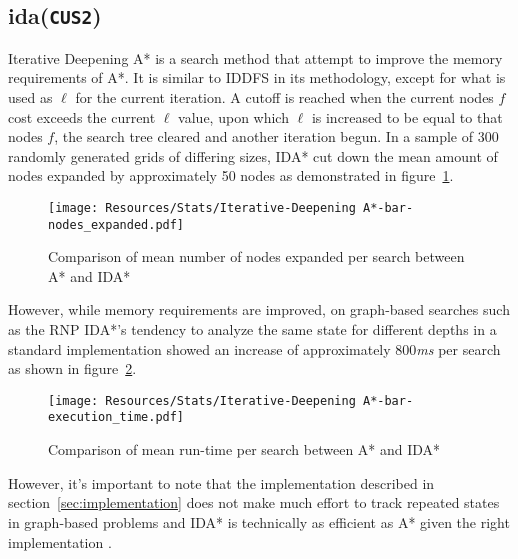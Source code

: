 \subsection{\texorpdfstring{\acrfull{ida}(\texttt{CUS2})}{IDA}} %
\label{sub:texorpdfstring}
Iterative Deepening A* is a search method that attempt to improve the memory requirements of A*. It is similar to IDDFS in its methodology, except for what is used as $\ell$ for the current iteration. A cutoff is reached when the current nodes $f$ cost exceeds the current $\ell$ value, upon which $\ell$ is increased to be equal to that nodes $f$, the search tree cleared and another iteration begun. In a sample of 300 randomly generated grids of differing sizes, IDA* cut down the mean amount of nodes expanded by approximately 50 nodes as demonstrated in figure~\ref{fig:idas_as_expanded}.

\begin{figure}[H]
	\label{fig:idas_as_expanded}
	\centerline{
		\texttt{[image: Resources/Stats/Iterative-Deepening A*-bar-nodes\_expanded.pdf]}
	}
	\caption{Comparison of mean number of nodes expanded per search between A* and IDA*}
\end{figure}

However, while memory requirements are improved, on graph-based searches such as the RNP IDA*'s tendency to analyze the same state for different depths in a standard implementation showed an increase of approximately 800\textit{ms} per search as shown in figure~\ref{fig:idas_as_runtime}.

\begin{figure}[H]
	\label{fig:idas_as_runtime}
	\centerline{
		\texttt{[image: Resources/Stats/Iterative-Deepening A*-bar-execution\_time.pdf]}
	}
	\caption{Comparison of mean run-time per search between A* and IDA*}
\end{figure}

However, it's important to note that the implementation described in section~\ref{sec:implementation} does not make much effort to track repeated states in graph-based problems and IDA* is technically as efficient as A* given the right implementation \parencite{idas}.


